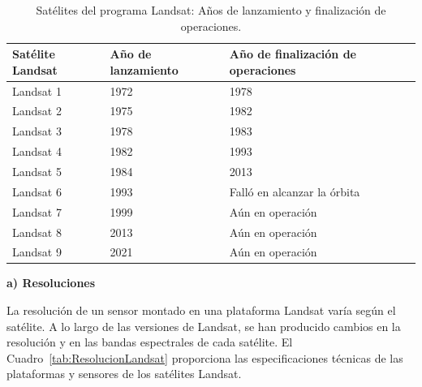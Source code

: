 \begin{table}[H]
    \caption{Satélites del programa Landsat: Años de lanzamiento y finalización de operaciones.}
    \small
    \begin{tabularx}{1\textwidth}{p{2.5cm}p{5cm}X}
        \hline
        \textbf{Satélite Landsat} & \textbf{Año de lanzamiento} & \textbf{Año de finalización de operaciones} \\
        \hline
        Landsat 1                 & 1972                        & 1978                                        \\ \hline
        Landsat 2                 & 1975                        & 1982                                        \\ \hline
        Landsat 3                 & 1978                        & 1983                                        \\ \hline
        Landsat 4                 & 1982                        & 1993                                        \\ \hline
        Landsat 5                 & 1984                        & 2013                                        \\ \hline
        Landsat 6                 & 1993                        & Falló en alcanzar la órbita                 \\ \hline
        Landsat 7                 & 1999                        & Aún en operación                            \\ \hline
        Landsat 8                 & 2013                        & Aún en operación                            \\ \hline
        Landsat 9                 & 2021                        & Aún en operación                            \\ \hline
    \end{tabularx}
    \begin{minipage}{\textwidth}
        \vspace{10pt}
        \label{tab:ProgramaLandsat}
    \end{minipage}
\end{table}

\textbf{a) Resoluciones}

La resolución de un sensor montado en una plataforma Landsat varía según el satélite. A lo largo de las versiones de Landsat, se han producido cambios en la resolución y en las bandas espectrales de cada satélite. El Cuadro~\ref{tab:ResolucionLandsat} proporciona las especificaciones técnicas de las plataformas y sensores de los satélites Landsat.

